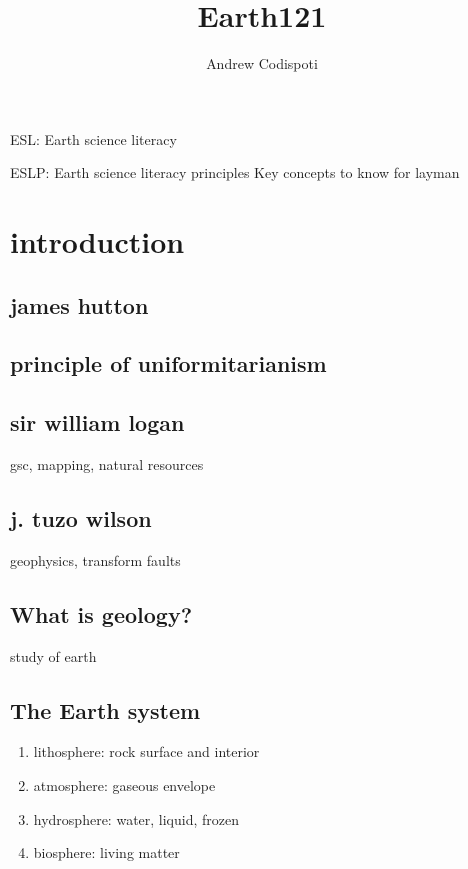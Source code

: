 \documentclass[11pt]{amsart}
\title{Earth121}
\author{Andrew Codispoti}
\begin{document}
\maketitle
\par ESL: Earth science literacy
\par ESLP: Earth science literacy principles Key concepts to know for layman
\section{introduction}
\subsection{james hutton}
\subsection{principle of uniformitarianism}
\subsection{sir william logan}
\par gsc, mapping, natural resources

\subsection{j. tuzo wilson}
\par geophysics, transform faults
\subsection{What is geology?}
\par study of earth
\subsection{The Earth system}
\begin{enumerate}
  \item lithosphere: rock surface and interior
  \item atmosphere: gaseous envelope
  \item hydrosphere: water, liquid, frozen
  \item biosphere: living matter
\end{enumerate}
\end{document}
